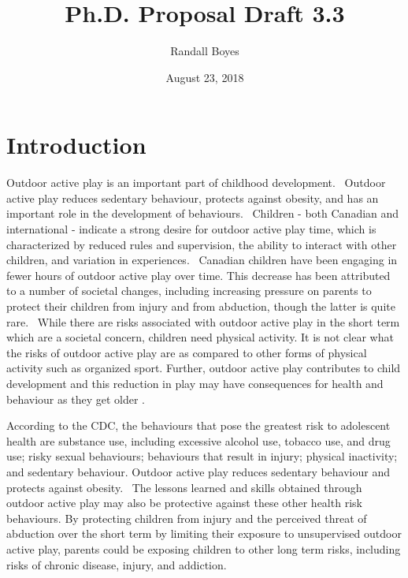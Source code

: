 \documentclass [11pt]{article}
\title{Ph.D. Proposal Draft 3.3}
\author{Randall Boyes}
\date{August 23, 2018}
\begin{document}
\maketitle


\section{Introduction}
Outdoor active play is an important part of childhood development.~\cite{Curtis2012-ql,Pearce2008-lq,Pernsteiner2012-qm} Outdoor active play reduces sedentary behaviour, protects against obesity, and has an important role in the development of behaviours.~\cite{Ansari2015-ig} Children - both Canadian and international - indicate a strong desire for outdoor active play time, which is characterized by reduced rules and supervision, the ability to interact with other children, and variation in experiences.~\cite{Watson2016-qd,Caro2016-er,Herrington2015-pb} Canadian children have been engaging in fewer hours of outdoor active play over time. This decrease has been attributed to a number of societal changes, including increasing pressure on parents to protect their children from injury and from abduction, though the latter is quite rare.~\cite{Mitra2014-qg} While there are risks associated with outdoor active play in the short term which are a societal concern, children need physical activity. It is not clear what the risks of outdoor active play are as compared to other forms of physical activity such as organized sport. Further, outdoor active play contributes to child development and this reduction in play may have consequences for health and behaviour as they get older \cite{barker2014less}. 

According to the CDC, the behaviours that pose the greatest risk to adolescent health are substance use, including excessive alcohol use, tobacco use, and drug use; risky sexual behaviours; behaviours that result in injury; physical inactivity; and sedentary behaviour. Outdoor active play reduces sedentary behaviour and protects against obesity.~\cite{Ansari2015-ig} The lessons learned and skills obtained through outdoor active play may also be protective against these other health risk behaviours. By protecting children from injury and the perceived threat of abduction over the short term by limiting their exposure to unsupervised outdoor active play, parents could be exposing children to other long term risks, including risks of chronic disease, injury, and addiction.
\end{document}
